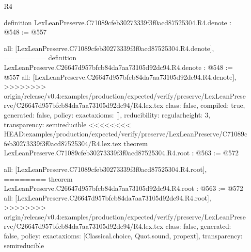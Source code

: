 \begin{lexlean}{R4}
\begin{coremodule}
{{{{{{definition LexLeanPreserve.C71089cfeb30273339f3f0acd87525304.R4.denote : @548 := @557 {
  all: [LexLeanPreserve.C71089cfeb30273339f3f0acd87525304.R4.denote],
========
definition LexLeanPreserve.C26647d957bfcb84da7aa73105d92dc94.R4.denote : @548 := @557 {
  all: [LexLeanPreserve.C26647d957bfcb84da7aa73105d92dc94.R4.denote],
>>>>>>>> origin/release/v0.4:examples/production/expected/verify/preserve/LexLeanPreserve/C26647d957bfcb84da7aa73105d92dc94/R4.lex.tex
  class: false,
  compiled: true,
  generated: false,
  policy: exact{axioms: []},
  reducibility: regular{height: 3},
  transparency: semireducible
}
<<<<<<<< HEAD:examples/production/expected/verify/preserve/LexLeanPreserve/C71089cfeb30273339f3f0acd87525304/R4.lex.tex
theorem LexLeanPreserve.C71089cfeb30273339f3f0acd87525304.R4.root : @563 := @572 {
  all: [LexLeanPreserve.C71089cfeb30273339f3f0acd87525304.R4.root],
========
theorem LexLeanPreserve.C26647d957bfcb84da7aa73105d92dc94.R4.root : @563 := @572 {
  all: [LexLeanPreserve.C26647d957bfcb84da7aa73105d92dc94.R4.root],
>>>>>>>> origin/release/v0.4:examples/production/expected/verify/preserve/LexLeanPreserve/C26647d957bfcb84da7aa73105d92dc94/R4.lex.tex
  class: false,
  generated: false,
  policy: exact{axioms: [Classical.choice, Quot.sound, propext]},
  transparency: semireducible
}

}}}}}}}}
\end{coremodule}
\end{lexlean}
